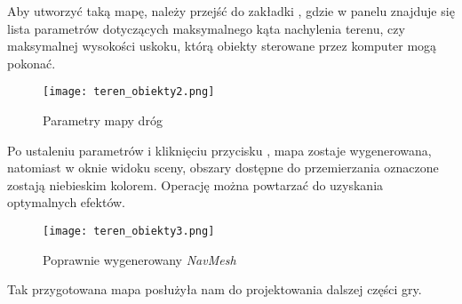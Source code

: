     Aby utworzyć taką mapę, należy przejść do zakładki , gdzie w panelu  znajduje się lista parametrów dotyczących maksymalnego kąta nachylenia terenu, czy maksymalnej wysokości uskoku, którą obiekty sterowane przez komputer mogą pokonać.

    \begin{figure}[H]
    \center
    \texttt{[image: teren\_obiekty2.png]}
    \caption{Parametry mapy dróg}
    \end{figure}

    Po ustaleniu parametrów i kliknięciu przycisku , mapa zostaje wygenerowana, natomiast w oknie widoku sceny, obszary dostępne do przemierzania oznaczone zostają niebieskim kolorem. Operację można powtarzać do uzyskania optymalnych efektów.

    \begin{figure}[H]
    \center
    \texttt{[image: teren\_obiekty3.png]}
    \caption{Poprawnie wygenerowany \textit{NavMesh}}
    \end{figure}

    Tak przygotowana mapa posłużyła nam do projektowania dalszej części gry.

